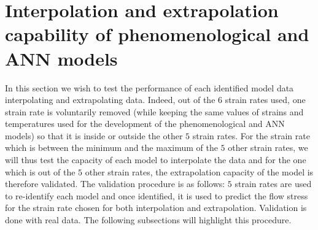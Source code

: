 \documentclass[twoside,english,1p,final,sort&compress]{elsarticle}
\theoremstyle{plain}
\begin{document}
\section{Interpolation and extrapolation capability of phenomenological and ANN models \label{sec:inExtrapolation}}
In this section we wish to test the performance of each identified model data interpolating and extrapolating data. Indeed, out of the $6$ strain rates used, one strain rate is voluntarily removed (while keeping the same values of strains and temperatures used for the development of the phenomenological and ANN models) so that it is inside or outside the other $5$ strain rates. For the strain rate which is between the minimum and the maximum of the $5$ other strain rates, we will thus test the capacity of each model to interpolate the data and for the one which is out of the $5$ other strain rates, the extrapolation capacity of the model is therefore validated. The validation procedure is as follows: $5$ strain rates are used to re-identify each model and once identified, it is used to predict the flow stress for the strain rate chosen for both interpolation and extrapolation. Validation is done with real data. The following subsections will highlight this procedure.
\end{document}
